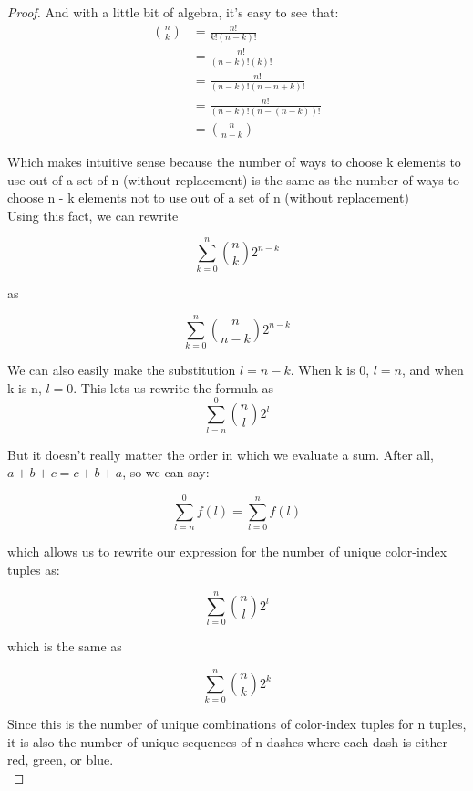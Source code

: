 \documentclass[11pt,fleqn]{article}
\theoremstyle{definition}
\theoremstyle{remark}
\begin{document}
\begin{enumerate}
\begin{proof}
        And with a little bit of algebra, it's easy to see that:\\ 
        
        \begin{align*}
            \binom{n}{k} &= \frac{n!}{k!(n-k)!} \\
                         &= \frac{n!}{(n-k)!(k)!} \\
                         &= \frac{n!}{(n-k)!(n - n + k)!} \\
                         &= \frac{n!}{(n-k)!(n-(n-k))!} \\
                         &= \binom{n}{n-k}
        \end{align*}

        Which makes intuitive sense because the number of ways
        to choose k elements to use out of a set of n 
        (without replacement) is the same as the number of ways to 
        choose n - k elements not to use out of a set of n 
        (without replacement)\\ 

        Using this fact, we can rewrite 

        \[
        \sum_{k=0}^{n} \binom{n}{k} 2^{n - k}
        \]

        as 

        \[
        \sum_{k=0}^{n} \binom{n}{n - k} 2^{n - k}
        \]

        We can also easily make the substitution $l = n-k$.
        When k is 0, $l=n$, and when k is n, $l=0$. This lets 
        us rewrite the formula as\\

        \[
        \sum_{l=n}^{0} \binom{n}{l} 2^{l}
        \]

        But it doesn't really matter the order in which we evaluate
        a sum. After all, $a + b + c = c + b + a$, so we can say:

        \[
        \sum_{l=n}^{0} f(l) = \sum_{l=0}^{n} f(l)
        \]

        which allows us to rewrite our expression for the number of 
        unique color-index tuples as: 

        \[
        \sum_{l=0}^{n} \binom{n}{l} 2^{l}
        \]

        which is the same as 

        \[
        \sum_{k=0}^{n} \binom{n}{k} 2^{k}
        \]

        Since this is the number of unique combinations
        of color-index tuples for n tuples, it is also the 
        number of unique sequences of n dashes where
        each dash is either red, green, or blue.\\


\end{proof}
\end{enumerate}
\end{document}
